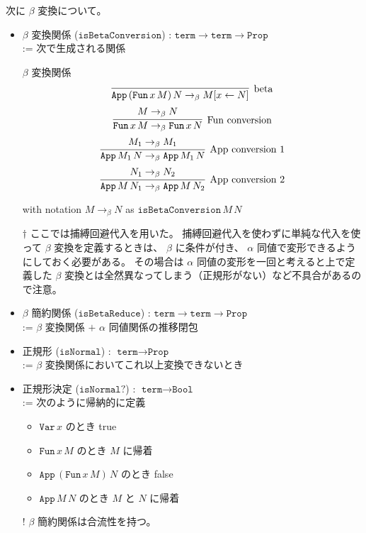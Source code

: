 \documentclass[dvipdfmx]{jsarticle}
\begin{document}
次に \(\beta\) 変換について。
\begin{itemize}
  \item \(\beta\) 変換関係 (\(\texttt{isBetaConversion}\)) : \(\texttt{term} \to \texttt{term} \to \texttt{Prop}\) \\
    := 次で生成される関係
    \begin{itembox}[l]{\(\beta\) 変換関係}
      \[\infer[\text{beta}]{\texttt{App} \, (\texttt{Fun} \, x \, M) \, N \to_{\beta} M[x \leftarrow N]}{}\]
      \[\infer[\text{Fun conversion}]{\texttt{Fun} \, x \, M \to_{\beta} \texttt{Fun} \, x \, N}{M \to_{\beta} N}\]
      \[\infer[\text{App conversion 1}]{\texttt{App} \, M_1 \, N \to_{\beta} \texttt{App} \, M_1 \, N}{M_1 \to_{\beta} M_1}\]
      \[\infer[\text{App conversion 2}]{\texttt{App} \, M \, N_1 \to_{\beta} \texttt{App} \, M \, N_2}{N_1 \to_{\beta} N_2}\]
    \end{itembox}
    with notation \(M \to_{\beta} N\) as \(\texttt{isBetaConversion} \, M \, N\)
  \item[\(\dagger\)] ここでは捕縛回避代入を用いた。
    捕縛回避代入を使わずに単純な代入を使って \(\beta\) 変換を定義するときは、 \(\beta\) に条件が付き、 \(\alpha\) 同値で変形できるようにしておく必要がある。
    その場合は \(\alpha\) 同値の変形を一回と考えると上で定義した \(\beta\) 変換とは全然異なってしまう（正規形がない）など不具合があるので注意。
  \item \(\beta\) 簡約関係 (\(\texttt{isBetaReduce}\)) : \(\texttt{term} \to \texttt{term} \to \texttt{Prop}\) \\
    := \(\beta\) 変換関係 \(+\) \(\alpha\) 同値関係の推移閉包
  \item 正規形 (\(\texttt{isNormal}\)) : \(\texttt{term} \to \texttt{Prop}\) \\
    := \(\beta\) 変換関係においてこれ以上変換できないとき
  \item 正規形決定 (\(\texttt{isNormal?}\)) : \(\texttt{term} \to \texttt{Bool}\) \\
    := 次のように帰納的に定義
    \begin{itemize}
      \item \(\texttt{Var} \, x\) のとき true
      \item \(\texttt{Fun} \, x \, M\) のとき \(M\) に帰着
      \item \(\texttt{App} \, (\texttt{Fun} \, x \, M) \, N\) のとき false
      \item \(\texttt{App} \, M \, N\) のとき \(M\) と \(N\) に帰着
    \end{itemize}
  \item[!] \(\beta\) 簡約関係は合流性を持つ。

\end{itemize}
\end{document}
